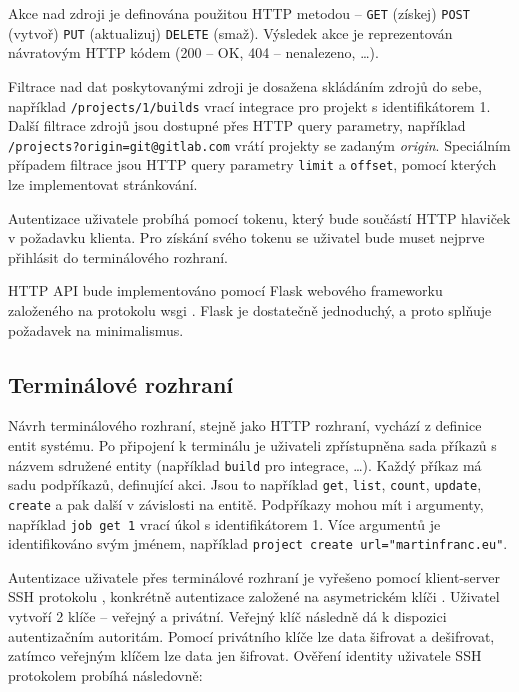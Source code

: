 Akce nad zdroji je definována použitou HTTP metodou -- \verb|GET| (získej) \verb|POST| (vytvoř) \verb|PUT| (aktualizuj) \verb|DELETE| (smaž).
Výsledek akce je reprezentován návratovým HTTP kódem (200 -- OK, 404 -- nenalezeno, \ldots).

Filtrace nad dat poskytovanými zdroji je dosažena skládáním zdrojů do sebe, například \verb|/projects/1/builds| vrací integrace pro projekt s identifikátorem 1.
Další filtrace zdrojů jsou dostupné přes HTTP query parametry, například \verb|/projects?origin=git@gitlab.com| vrátí projekty se zadaným \textit{origin}.
Speciálním případem filtrace jsou HTTP query parametry \verb|limit| a \verb|offset|, pomocí kterých lze implementovat stránkování.

Autentizace uživatele probíhá pomocí tokenu, který bude součástí HTTP hlaviček v požadavku klienta.
Pro získání svého tokenu se uživatel bude muset nejprve přihlásit do terminálového rozhraní.


HTTP API bude implementováno pomocí Flask webového frameworku založeného na protokolu wsgi \cite{flask}.
Flask je dostatečně jednoduchý, a proto splňuje požadavek na minimalismus.

\subsection{Terminálové rozhraní}

Návrh terminálového rozhraní, stejně jako HTTP rozhraní, vychází z definice entit systému.
Po připojení k terminálu je uživateli zpřístupněna sada příkazů s názvem sdružené entity (například \verb|build| pro integrace, \ldots).
Každý příkaz má sadu podpříkazů, definující akci.
Jsou to například \verb|get|, \verb|list|, \verb|count|, \verb|update|, \verb|create| a pak další v závislosti na entitě.
Podpříkazy mohou mít i argumenty, například \verb|job get 1| vrací úkol s identifikátorem 1.
Více argumentů je identifikováno svým jménem, například \verb|project create url="martinfranc.eu"|.

Autentizace uživatele přes terminálové rozhraní je vyřešeno pomocí klient-server SSH protokolu \cite{ssh_rfc}, konkrétně autentizace založené na asymetrickém klíči \cite{ssh_auth_rfc}.
Uživatel vytvoří 2 klíče -- veřejný a privátní.
Veřejný klíč následně dá k dispozici autentizačním autoritám.
Pomocí privátního klíče lze data šifrovat a dešifrovat, zatímco veřejným klíčem lze data jen šifrovat.
Ověření identity uživatele SSH protokolem probíhá následovně:

